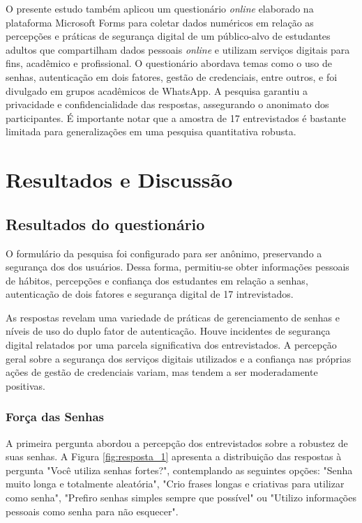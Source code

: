 \documentclass[12pt]{article}
\begin{document}
O presente estudo também aplicou um questionário \textit{online} \cite{forms2025} elaborado
na plataforma Microsoft Forms para coletar dados numéricos em relação as percepções e
práticas de segurança digital de um público-alvo de estudantes adultos que compartilham dados
pessoais \textit{online} e utilizam serviços digitais para fins, acadêmico e profissional.
O questionário abordava temas como o uso de senhas, autenticação em dois fatores, gestão de
credenciais, entre outros, e foi divulgado em grupos acadêmicos de WhatsApp.
A pesquisa garantiu a privacidade e confidencialidade das respostas, assegurando o anonimato
dos participantes.
É importante notar que a amostra de 17 entrevistados é bastante limitada para
generalizações em uma pesquisa quantitativa robusta.

\section{Resultados e Discussão}

\subsection{Resultados do questionário}

O formulário da pesquisa foi configurado para ser anônimo, preservando a segurança dos
dos usuários.
Dessa forma, permitiu-se obter informações pessoais de hábitos, percepções e confiança
dos estudantes em relação a senhas, autenticação de dois fatores e segurança digital de
17 intrevistados.

As respostas revelam uma variedade de práticas de gerenciamento de senhas e níveis
de uso do duplo fator de autenticação.
Houve incidentes de segurança digital relatados por uma parcela significativa dos
entrevistados.
A percepção geral sobre a segurança dos serviços digitais utilizados e a confiança
nas próprias ações de gestão de credenciais variam, mas tendem a ser moderadamente
positivas.

\subsubsection{Força das Senhas}

A primeira pergunta abordou a percepção dos entrevistados sobre a robustez de suas senhas.
A Figura \ref{fig:resposta_1} apresenta a distribuição das respostas à pergunta "Você
utiliza senhas fortes?", contemplando as seguintes opções: "Senha muito longa e
totalmente aleatória", "Crio frases longas e criativas para utilizar como senha",
"Prefiro senhas simples sempre que possível" ou "Utilizo informações pessoais como senha
para não esquecer".
\end{document}
